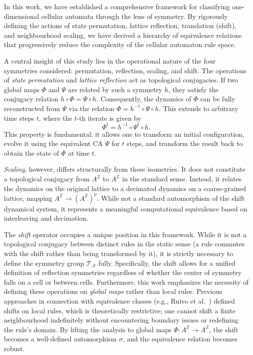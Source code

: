 \documentclass[a4paper]{article}
\begin{document}
In this work, we have established a comprehensive framework for classifying one-dimensional cellular automata through the lens of symmetry. By rigorously defining the actions of state permutation, lattice reflection, translation (shift), and neighbourhood scaling, we have derived a hierarchy of equivalence relations that progressively reduce the complexity of the cellular automaton rule space.

A central insight of this study lies in the operational nature of the four symmetries considered: permutation, reflection, scaling, and shift.
The operations of \textit{state permutation} and \textit{lattice reflection} act as topological conjugacies. If two global maps $\Phi$ and $\Psi$ are related by such a symmetry $h$, they satisfy the conjugacy relation $h \circ \Phi = \Psi \circ h$. Consequently, the dynamics of $\Phi$ can be fully reconstructed from $\Psi$ via the relation $\Phi = h^{-1} \circ \Psi \circ h$. This extends to arbitrary time steps $t$, where the $t$-th iterate is given by
\[
\Phi^t = h^{-1} \circ \Psi^t \circ h.
\]
This property is fundamental: it allows one to transform an initial configuration, evolve it using the equivalent CA $\Psi$ for $t$ steps, and transform the result back to obtain the state of $\Phi$ at time $t$.

\textit{Scaling}, however, differs structurally from these isometries. It does not constitute a topological conjugacy from $A^{\mathbb{Z}}$ to $A^{\mathbb{Z}}$ in the standard sense. Instead, it relates the dynamics on the original lattice to a decimated dynamics on a coarse-grained lattice, mapping $A^{\mathbb{Z}} \to (A^{\mathbb{Z}})^p$. While not a standard automorphism of the shift dynamical system, it represents a meaningful computational equivalence based on interleaving and decimation.

The \textit{shift} operator occupies a unique position in this framework. While it is not a topological conjugacy between distinct rules in the static sense (a rule commutes with the shift rather than being transformed by it), it is strictly necessary to define the symmetry group $\mathcal{T}_{\mathcal{A}}$ fully. Specifically, the shift allows for a unified definition of reflection symmetries regardless of whether the center of symmetry falls on a cell or between cells. Furthermore, this work emphasizes the necessity of defining these operations on \textit{global maps} rather than local rules.
Previous approaches in connection with equivalence classes (e.g., Ruivo et al.~\cite{RUIVO2018280}) defined shifts on local rules, which is theoretically restrictive; one cannot shift a finite neighbourhood indefinitely without encountering boundary issues or redefining the rule's domain. By lifting the analysis to global maps $\Phi: A^{\mathbb{Z}} \to A^{\mathbb{Z}}$, the shift becomes a well-defined automorphism $\sigma$, and the equivalence relation becomes robust.
\end{document}

